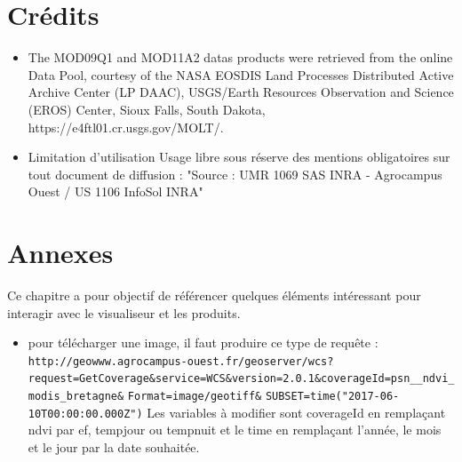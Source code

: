 \documentclass[10pt,a4paper]{article}
\begin{document}
\section{Crédits}
\begin{itemize}
\item The MOD09Q1 and MOD11A2 datas products were retrieved from the online Data Pool, courtesy of the NASA EOSDIS Land Processes Distributed Active Archive Center (LP DAAC), USGS/Earth Resources Observation and Science (EROS) Center, Sioux Falls, South Dakota, https://e4ftl01.cr.usgs.gov/MOLT/. 
\item Limitation d'utilisation
Usage libre sous réserve des mentions obligatoires sur tout document de diffusion : "Source : UMR 1069 SAS INRA - Agrocampus Ouest / US 1106 InfoSol INRA" 
\end{itemize}

\section{Annexes}

Ce chapitre a pour objectif de référencer quelques éléments intéressant pour interagir avec le visualiseur et les produits.

\begin{itemize}
\item pour télécharger une image, il faut produire ce type de requête : \newline
\verb!http://geowww.agrocampus-ouest.fr/geoserver/wcs?!\newline\verb!request=GetCoverage&service=WCS&version=2.0.1&!\newline\verb!coverageId=psn__ndvi_modis_bretagne&!
\newline\verb!Format=image/geotiff&!
\newline\verb!SUBSET=time("2017-06-10T00:00:00.000Z")! \smallbreak 
Les variables à modifier sont coverageId en remplaçant ndvi par ef, tempjour ou tempnuit et le time en remplaçant l'année, le mois et le jour par la date souhaitée.
\end{itemize}
\end{document}
